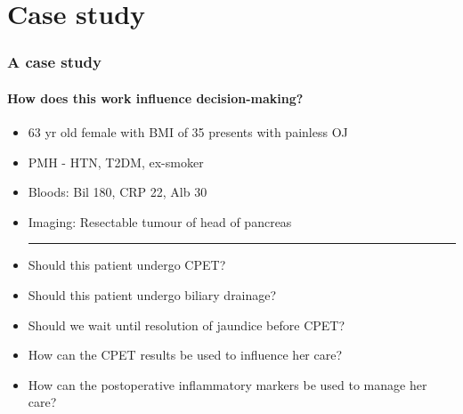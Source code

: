 \documentclass[10pt]{beamer}
\begin{document}
\section{Case study}
\begin{frame}
	\frametitle{A case study}
	\framesubtitle{How does this work influence decision-making?}
	\begin{itemize}
		\item 63 yr old female with BMI of 35 presents with painless OJ
		\item PMH - HTN, T2DM, ex-smoker
		\item Bloods: Bil 180, CRP 22, Alb 30
		\item Imaging: Resectable tumour of head of pancreas
		\medskip \hrule \medskip
\pause
		\item Should this patient undergo CPET?
		\item Should this patient undergo biliary drainage?
		\item Should we wait until resolution of jaundice before CPET?
		\item How can the CPET results be used to influence her care?
		\item How can the postoperative inflammatory markers be used to manage her care?
	\end{itemize}
\end{frame}
\end{document}
